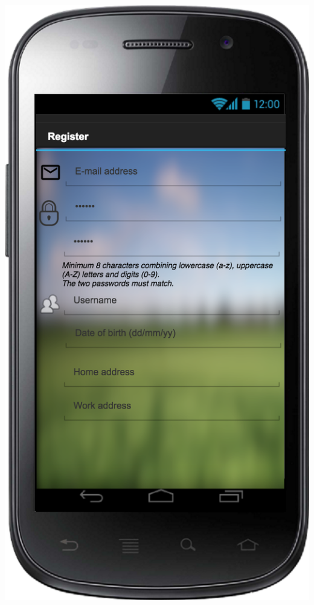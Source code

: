 \documentclass[a4paper,leqno]{article}
\begin{document}
\begin{minipage}[!b]{.5\linewidth}
	\begin{center}
	\includegraphics[scale = 0.15]{Registration.png}
	\end{center}
\end{minipage}
\end{document}
